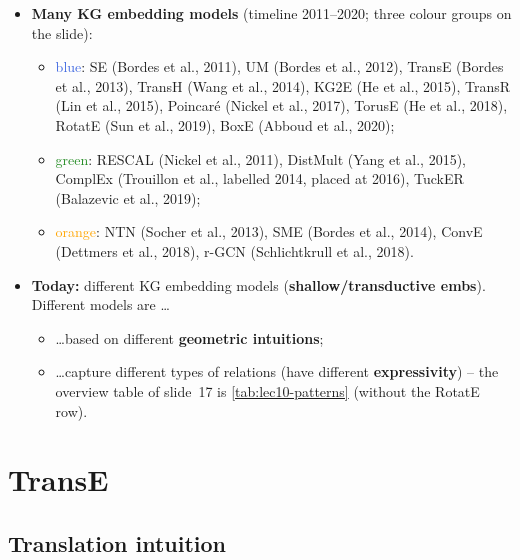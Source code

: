 \begin{itemize}
  \item \textbf{Many KG embedding models} (timeline 2011--2020; three colour
    groups on the slide):
    \begin{itemize}
      \item \textcolor{RoyalBlue}{blue}: SE (Bordes et al., 2011), UM (Bordes et
        al., 2012), TransE (Bordes et al., 2013), TransH (Wang et al., 2014),
        KG2E (He et al., 2015), TransR (Lin et al., 2015), Poincar\'e (Nickel et
        al., 2017), TorusE (He et al., 2018), RotatE (Sun et al., 2019), BoxE
        (Abboud et al., 2020);
      \item \textcolor{ForestGreen}{green}: RESCAL (Nickel et al., 2011), DistMult
        (Yang et al., 2015), ComplEx (Trouillon et al., labelled 2014, placed at
        2016), TuckER (Balazevic et al., 2019);
      \item \textcolor{orange}{orange}: NTN (Socher et al., 2013), SME (Bordes et
        al., 2014), ConvE (Dettmers et al., 2018), r-GCN (Schlichtkrull et al.,
        2018).
    \end{itemize}
  \item \textbf{Today:} different KG embedding models
    (\textbf{shallow/transductive embs}). Different models are \dots
    \begin{itemize}
      \item \dots based on different \textbf{geometric intuitions};
      \item \dots capture different types of relations (have different
        \textbf{expressivity}) -- the overview table of slide~17 is
        \cref{tab:lec10-patterns} (without the RotatE row).
    \end{itemize}
\end{itemize}

\section{TransE}\label{sec:lec10-transe}

\subsection{Translation intuition}\label{sec:lec10-transe-def}

